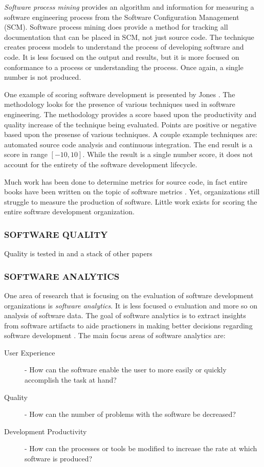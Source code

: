 \documentclass[SDSUThesis.tex]{subfiles}
\begin{document}
\textit{Software process mining} \cite{Rubin2007} provides
an algorithm and information for measuring a software engineering process from
the Software Configuration Management (SCM). Software process mining does provide a method for tracking all 
documentation that can be placed in SCM, not just source code.  The technique creates process models 
to understand the process of developing software and code. It is less focused on the output and results,
but it is more focused on conformance to a process or understanding the process. Once again, a single number is not produced.

One example of scoring software development is presented by Jones \cite{Jones2012}. The methodology looks
for the presence of various techniques used in software engineering.  The methodology provides a score based upon the 
productivity and quality increase of the technique being evaluated.  Points are positive or negative based upon the 
presense of various techniques. A couple example techniques are: 
automated source code analysis and continuous integration.  The end result is a score in range $[-10,10]$. 
While the result is a single number score, it does not account for the entirety of the software development lifecycle.

Much work has been done to determine metrics for source code, in fact 
entire books have been written on the topic of software metrics \cite{Jones1996, Putnam2013}. Yet, 
organizations still struggle to measure the production of software.
Little work exists
for scoring the entire software development organization. 

\subsubsection{SOFTWARE QUALITY}
Quality is tested in \cite{Miguel2014} and a stack of other papers

\subsubsection{SOFTWARE ANALYTICS}
One area of research that is focusing on the evaluation of software development organizations
is \textit{software analytics}.  It is less focused o evaluation
and more so on analysis of software data.  The goal of software analytics is to extract insights
from software artifacts to aide practioners in making better decisions regarding software
development \cite{Zhang2013}.  The main focus areas of software analytics are:
\begin{description}
    \item[User Experience] - How can the software enable the user to more easily or quickly 
        accomplish the task at hand?
    \item[Quality] - How can the number of problems with the software be decreased?
    \item[Development Productivity] - How can the processes or tools be modified to increase 
        the rate at which software is produced? 
\end{description}
\end{document}
